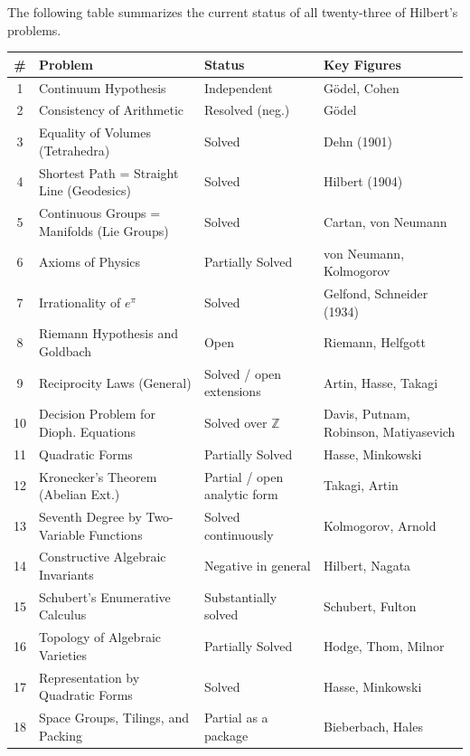 The following table summarizes the current status of all twenty-three of Hilbert's problems.

\begin{center}
\footnotesize
\setlength{\tabcolsep}{3.5pt}
\renewcommand{\arraystretch}{1.15}
\begin{tabular}{c >{\raggedright\arraybackslash}p{3.8cm} >{\raggedright\arraybackslash}p{1.6cm} >{\raggedright\arraybackslash}p{3.8cm}}
\toprule
\textbf{\#} & \textbf{Problem} & \textbf{Status} & \textbf{Key Figures} \\
\midrule
1 & Continuum Hypothesis & Independent & G\"odel, Cohen \\
2 & Consistency of Arithmetic & Resolved (neg.) & G\"odel \\
3 & Equality of Volumes (Tetrahedra) & Solved & Dehn (1901) \\
4 & Shortest Path = Straight Line (Geodesics) & Solved & Hilbert (1904) \\
5 & Continuous Groups = Manifolds (Lie Groups) & Solved & Cartan, von Neumann \\
6 & Axioms of Physics & Partially Solved & von Neumann, Kolmogorov \\
7 & Irrationality of $e^\pi$ & Solved & Gelfond, Schneider (1934) \\
8 & Riemann Hypothesis and Goldbach & Open & Riemann, Helfgott \\
9 & Reciprocity Laws (General) & Solved / open extensions & Artin, Hasse, Takagi \\
10 & Decision Problem for Dioph. Equations & Solved over $\mathbb{Z}$ & Davis, Putnam, Robinson, Matiyasevich \\
11 & Quadratic Forms & Partially Solved & Hasse, Minkowski \\
12 & Kronecker's Theorem (Abelian Ext.) & Partial / open analytic form & Takagi, Artin \\
13 & Seventh Degree by Two-Variable Functions & Solved continuously & Kolmogorov, Arnold \\
14 & Constructive Algebraic Invariants & Negative in general & Hilbert, Nagata \\
15 & Schubert's Enumerative Calculus & Substantially solved & Schubert, Fulton \\
16 & Topology of Algebraic Varieties & Partially Solved & Hodge, Thom, Milnor \\
17 & Representation by Quadratic Forms & Solved & Hasse, Minkowski \\
18 & Space Groups, Tilings, and Packing & Partial as a package & Bieberbach, Hales \\

\end{tabular}
\end{center}
